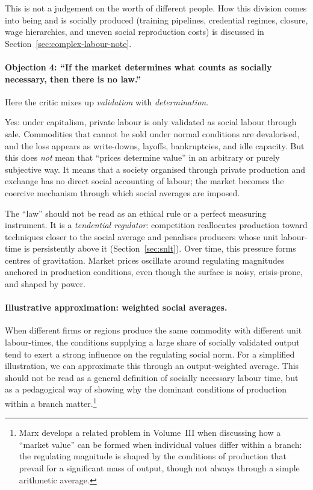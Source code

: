 This is not a judgement on the worth of different people.
How this division comes into being and is socially produced (training pipelines, credential regimes, closure, wage hierarchies,
and uneven social reproduction costs) is discussed in Section~\ref{sec:complex-labour-note}.\cite{Foley1986,Shaikh2016}


\paragraph{Objection 4: ``If the market determines what counts as socially necessary, then there is no law.''}
Here the critic mixes up \emph{validation} with \emph{determination}.

Yes: under capitalism, private labour is only validated as social labour through sale. Commodities that cannot be sold under normal conditions are devalorised,
and the loss appears as write-downs, layoffs, bankruptcies, and idle capacity.\cite{Marx1867,Shaikh2016}
But this does \emph{not} mean that ``prices determine value'' in an arbitrary or purely subjective way. It means that a society organised through private production
and exchange has no direct social accounting of labour; the market becomes the coercive mechanism through which social averages are imposed.

The ``law'' should not be read as an ethical rule or a perfect measuring instrument. It is a \emph{tendential regulator}: competition reallocates production toward techniques closer to
the social average and penalises producers whose unit labour-time is persistently above it (Section~\ref{sec:snlt}). Over time, this pressure forms centres of
gravitation. Market prices oscillate around regulating magnitudes anchored in production conditions, even though the surface is noisy, crisis-prone, and shaped by
power.\cite{Shaikh2016}

\paragraph{Illustrative approximation: weighted social averages.} When different firms or regions produce the same commodity with different unit labour-times, the conditions supplying a large share of socially validated output tend to exert a strong influence on the regulating social norm. For a simplified illustration, we can approximate this through an output-weighted average. This should not be read as a general definition of socially necessary labour time, but as a pedagogical way of showing why the dominant conditions of production within a branch matter.\footnote{Marx develops a related problem in Volume~III when discussing how a ``market value'' can be formed when individual values differ within a branch: the regulating magnitude is shaped by the conditions of production that prevail for a significant mass of output, though not always through a simple arithmetic average.\cite{Marx1894}}

